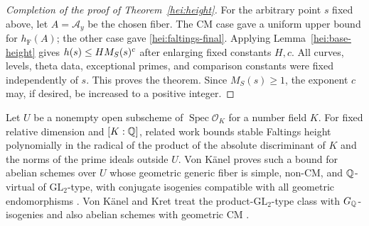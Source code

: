 \begin{proof}[Completion of the proof of Theorem~\ref{hei:height}]
For the arbitrary point $s$ fixed above, let $A=\mathcal A_y$ be the
chosen fiber.  The CM case gave a uniform
upper bound for $h_{\mathrm F}(A)$; the other case gave
\eqref{hei:faltings-final}.  Applying Lemma~\ref{hei:base-height}
gives $h(s)\le H M_S(s)^c$ after enlarging fixed constants $H,c$.
All curves, levels, theta data, exceptional primes, and comparison
constants were fixed independently of $s$.  This proves the
theorem.  Since $M_S(s)\ge1$, the exponent $c$ may, if desired,
be increased to a positive integer.
\end{proof}

\begin{remark}
Let \(U\) be a nonempty open subscheme of
\(\operatorname{Spec}\mathcal O_K\) for a number field \(K\).
For fixed relative dimension and \([K:\mathbb Q]\), related work bounds
stable Faltings height polynomially in the radical of the product
of the absolute discriminant of \(K\) and the norms of the prime
ideals outside \(U\).
Von K\"anel proves such a bound for abelian schemes over \(U\) whose geometric
generic fiber is simple, non-CM, and \(\mathbb Q\)-virtual of
\(\mathrm{GL}_2\)-type, with conjugate isogenies compatible with all
geometric endomorphisms
\cite[Proposition~9.9]{vonKaenel2013Preprint}.
Von K\"anel and Kret treat the product-\(\mathrm{GL}_2\)-type class
with \(G_\mathbb Q\)-isogenies and also abelian schemes with geometric CM
\cite[Theorem~7.1]{vonKaenelKret2023}.
\end{remark}
